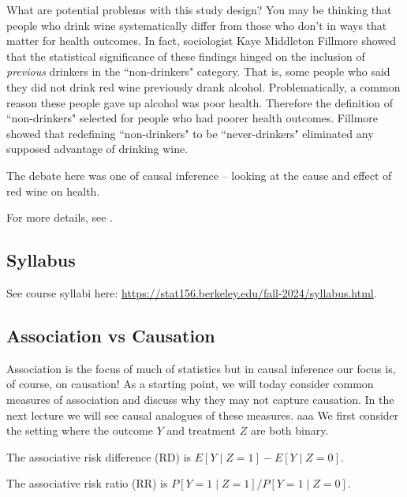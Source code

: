 \documentclass[11pt]{elegantbook}
\begin{document}
What are potential problems with this study design? You may be thinking that people who drink wine systematically differ from those who don't in ways that matter for health outcomes. In fact, sociologist Kaye Middleton Fillmore showed that the statistical significance of these findings hinged on the inclusion of \emph{previous} drinkers in the ``non-drinkers" category. That is, some people who said they did not drink red wine previously drank alcohol. Problematically, a common reason these people gave up alcohol was poor health. Therefore the definition of  ``non-drinkers" selected for people who had poorer health outcomes. Fillmore showed that redefining ``non-drinkers" to be ``never-drinkers" eliminated any supposed advantage of drinking wine.

The debate here was one of causal inference -- looking at the cause and effect of red wine on health.

For more details, see \cite{fillmore2007moderate}.

\subsection{Syllabus}

See course syllabi here: \href{https://stat156.berkeley.edu/fall-2024/syllabus.html}{https://stat156.berkeley.edu/fall-2024/syllabus.html}.

\subsection{Association vs Causation}

Association is the focus of much of statistics but in causal inference our focus is, of course, on causation! As a starting point, we will today consider common measures of association and discuss why they may not capture causation. In the next lecture we will see causal analogues of these measures.
aaa
We first consider the setting where the outcome $Y$ and treatment $Z$ are both binary. 

\begin{definition}
    The associative risk difference (RD) is $E[Y \mid Z = 1] - E[Y \mid Z = 0]$.
\end{definition}


\begin{definition}
    The associative risk ratio (RR) is $P[Y =1 \mid Z = 1]/P[Y =1 \mid Z = 0]$.
\end{definition}
\end{document}
